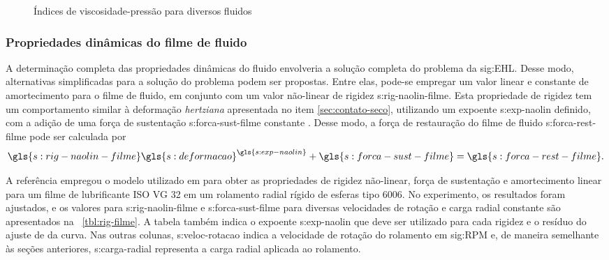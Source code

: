 \documentclass[12pt,oneside,english,brazil,lmodern,siglas,simbolos,cite=num]{ucsmonograph}
\begin{document}
	\begin{figure}[t]
		\caption{Índices de viscosidade-pressão para diversos fluidos}
		\label{fig:indices-visc-pressao}
	\end{figure}

	\subsubsection{Propriedades dinâmicas do filme de fluido} \label{sec:props-filme-fluido}
	A determinação completa das propriedades dinâmicas do fluido envolveria a solução completa do problema da \gls{sig:EHL}.
	Desse modo, alternativas simplificadas para a solução do problema podem ser propostas.
	Entre elas, pode-se empregar um valor linear e constante de amortecimento para o filme de fluido, em conjunto com um valor não-linear de rigidez \gls{s:rig-naolin-filme}.
	Esta propriedade de rigidez tem um comportamento similar à deformação \emph{hertziana} apresentada no item \ref{sec:contato-seco}, utilizando um expoente \gls{s:exp-naolin} definido, com a adição de uma força de sustentação \gls{s:forca-sust-filme} constante \cite{nonato:2014}.
	Desse modo, a força de restauração do filme de fluido \gls{s:forca-rest-filme} pode ser calculada por
	\begin{equation} \label{eqn:ehl:forca-rest}
		\gls{s:rig-naolin-filme}\gls{s:deformacao}^{\gls{s:exp-naolin}} +
		\gls{s:forca-sust-filme} = \gls{s:forca-rest-filme}.
	\end{equation}
	
	A referência \cite{nonato:2014} empregou o modelo utilizado em \cite{nonato:2010} para obter as propriedades de rigidez não-linear, força de sustentação e amortecimento linear para um filme de lubrificante ISO VG 32 em um rolamento radial rígido de esferas tipo 6006.
	No experimento, os resultados foram ajustados, e os valores para \gls{s:rig-naolin-filme} e \gls{s:forca-sust-filme} para diversas velocidades de rotação e carga radial constante são apresentados na \tablename\ \ref{tbl:rig-filme}.
	A tabela também indica o expoente \gls{s:exp-naolin} que deve ser utilizado para cada rigidez e o resíduo do ajuste de da curva.
	Nas outras colunas, \gls{s:veloc-rotacao} indica a velocidade de rotação do rolamento em \gls{sig:RPM} e, de maneira semelhante às seções anteriores, \gls{s:carga-radial} representa a carga radial aplicada ao rolamento.	
	
\end{document}

